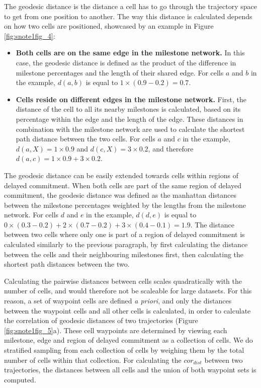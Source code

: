 The geodesic distance is the distance a cell has to go through the trajectory space to get from one position to another. The way this distance is calculated depends on how two cells are positioned, showcased by an example in Figure \ref{fig:snote1fig_4}:

\begin{itemize}
	\item \textbf{Both cells are on the same edge in the milestone network.} In this case, the geodesic distance is defined as the product of the difference in milestone percentages and the length of their shared edge. For cells $a$ and $b$ in the example, $d(a, b)$ is equal to $1 \times (0.9 - 0.2) = 0.7$.
	\item \textbf{Cells reside on different edges in the milestone network.} First, the distance of the cell to all its nearby milestones is calculated, based on its percentage within the edge and the length of the edge. These distances in combination with the milestone network are used to calculate the shortest path distance between the two cells. For cells $a$ and $c$ in the example, $d(a, X) = 1 \times 0.9$ and $d(c, X) = 3 \times 0.2$, and therefore $d(a, c) = 1 \times 0.9 + 3 \times 0.2$. 
\end{itemize}

The geodesic distance can be easily extended towards cells within regions of delayed commitment. When both cells are part of the same region of delayed commitment, the geodesic distance was defined as the manhattan distances between the milestone percentages weighted by the lengths from the milestone network. For cells $d$ and $e$ in the example, $d(d, e)$ is equal to $0 \times (0.3 - 0.2) + 2 \times (0.7 - 0.2) + 3 \times(0.4 - 0.1) = 1.9$. The distance between two cells where only one is part of a region of delayed commitment is calculated similarly to the previous paragraph, by first calculating the distance between the cells and their neighbouring milestones first, then calculating the shortest path distances between the two.

Calculating the pairwise distances between cells scales quadratically with the number of cells, and would therefore not be scaleable for large datasets. For this reason, a set of waypoint cells are defined \textit{a priori}, and only the distances between the waypoint cells and all other cells is calculated, in order to calculate the correlation of geodesic distances of two trajectories (Figure \ref{fig:snote1fig_5}a). These cell waypoints are determined by viewing each milestone, edge and region of delayed commitment as a collection of cells. We do stratified sampling from each collection of cells by weighing them by the total number of cells within that collection. For calculating the $\textit{cor}_{\textit{dist}}$ between two trajectories, the distances between all cells and the union of both waypoint sets is computed.

